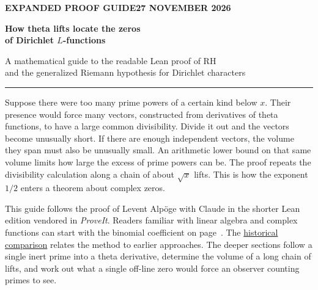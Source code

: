 \documentclass[11pt,letterpaper]{article}
\begin{document}
\thispagestyle{empty}
{\sffamily\small\bfseries\color{accent} EXPANDED PROOF GUIDE\hfill 27 NOVEMBER 2026}\par
\vspace{.36in}
{\fontsize{32}{37}\selectfont\bfseries\color{ink}How theta lifts locate the zeros\\ of Dirichlet \(L\)-functions\par}
\vspace{9pt}
{\large\color{quiet}A mathematical guide to the readable Lean proof of RH\\ and the generalized Riemann hypothesis for Dirichlet characters\par}
\vspace{13pt}\textcolor{accent}{\rule{\linewidth}{.85pt}}\par
\medskip
Suppose there were too many prime powers of a certain kind below \(x\). Their presence would force many vectors, constructed from derivatives of theta functions, to have a large common divisibility. Divide it out and the vectors become unusually short. If there are enough independent vectors, the volume they span must also be unusually small. An arithmetic lower bound on that same volume limits how large the excess of prime powers can be. The proof repeats the divisibility calculation along a chain of about \(\sqrt x\) lifts. This is how the exponent \(1/2\) enters a theorem about complex zeros.

This guide follows the proof of Levent Alpöge with Claude in the shorter Lean edition vendored in \emph{ProveIt}. Readers familiar with linear algebra and complex functions can start with the binomial coefficient on page~\pageref{sec:perspective}. The \hyperref[sec:earlier]{historical comparison} relates the method to earlier approaches. The deeper sections follow a single inert prime into a theta derivative, determine the volume of a long chain of lifts, and work out what a single off-line zero would force an observer counting primes to see.
\end{document}
